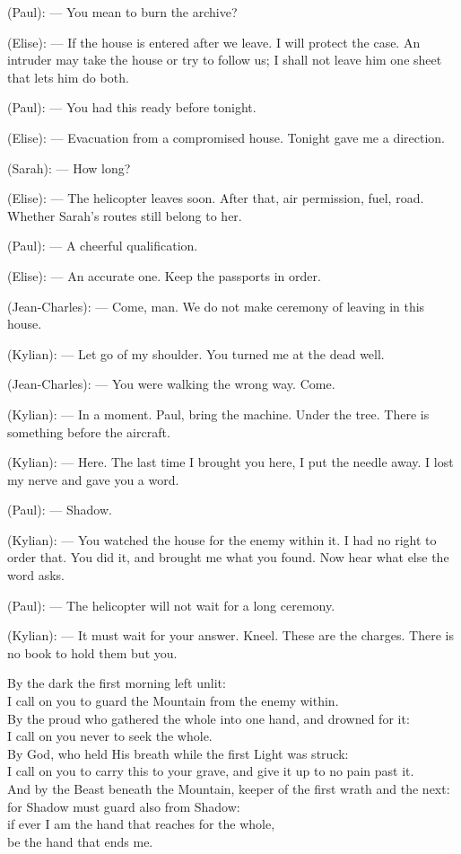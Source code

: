 \begin{room}
(Paul): --- You mean to burn the archive?

(Elise): --- If the house is entered after we leave. I will protect the case. An intruder may take the house or try to follow us; I shall not leave him one sheet that lets him do both.

(Paul): --- You had this ready before tonight.

(Elise): --- Evacuation from a compromised house. Tonight gave me a direction.

(Sarah): --- How long?

(Elise): --- The helicopter leaves soon. After that, air permission, fuel, road. Whether Sarah's routes still belong to her.

(Paul): --- A cheerful qualification.

(Elise): --- An accurate one. Keep the passports in order.

(Jean-Charles): --- Come, man. We do not make ceremony of leaving in this house.

(Kylian): --- Let go of my shoulder. You turned me at the dead well.

(Jean-Charles): --- You were walking the wrong way. Come.

(Kylian): --- In a moment. Paul, bring the machine. Under the tree. There is something before the aircraft.

\centerline{}

(Kylian): --- Here. The last time I brought you here, I put the needle away. I lost my nerve and gave you a word.

(Paul): --- Shadow.

(Kylian): --- You watched the house for the enemy within it. I had no right to order that. You did it, and brought me what you found. Now hear what else the word asks.

(Paul): --- The helicopter will not wait for a long ceremony.

(Kylian): --- It must wait for your answer. Kneel. These are the charges. There is no book to hold them but you.

\begin{scripture}
By the dark the first morning left unlit: \\
I call on you to guard the Mountain from the enemy within. \\
By the proud who gathered the whole into one hand, and drowned for it: \\
I call on you never to seek the whole. \\
By God, who held His breath while the first Light was struck: \\
I call on you to carry this to your grave, and give it up to no pain past it. \\
And by the Beast beneath the Mountain, keeper of the first wrath and the next: \\
for Shadow must guard also from Shadow: \\
if ever I am the hand that reaches for the whole, \\
be the hand that ends me.
\end{scripture}


\end{room}
